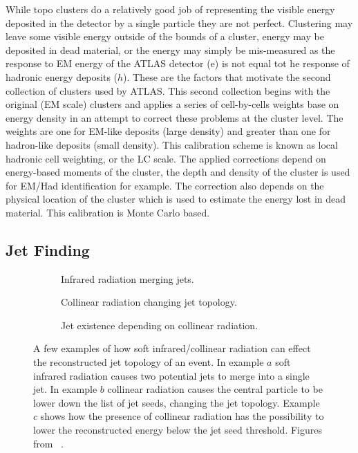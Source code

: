 While topo clusters do a relatively good job of representing the visible energy deposited in the detector by a single particle they are not perfect.  
Clustering may leave some visible energy outside of the bounds of a cluster, energy may be deposited in dead material, or the energy may simply be mis-measured as the response to EM energy of the ATLAS detector (e) is not equal tot he response of hadronic energy deposits ($h$).  
These are the factors that motivate the second collection of clusters used by ATLAS.  
This second collection begins with the original (EM scale) clusters and applies a series of cell-by-cells weights base on energy density in an attempt to correct these problems at the cluster level.  
The weights are one for EM-like deposits (large density) and greater than one for hadron-like deposits (small density).  
This calibration scheme is known as local hadronic cell weighting, or the LC scale.  
The applied corrections depend on energy-based moments of the cluster, the depth and density of the cluster is used for EM/Had identification for example.  
The correction also depends on the physical location of the cluster which is used to estimate the energy lost in dead material.  
This calibration is Monte Carlo based.  

\subsection{Jet Finding}

\begin{figure}[!ht]
 \centering
 \begin{subfigure}{.5\textwidth}
  \centering
  \caption{Infrared radiation merging jets.}
 \end{subfigure}%
 \begin{subfigure}{.5\textwidth}
  \centering
  \caption{Collinear radiation changing jet topology.}
 \end{subfigure}
 \begin{subfigure}{.5\textwidth}
  \centering
  \caption{Jet existence depending on collinear radiation.}
 \end{subfigure}
 \caption[Effect of radiation on jet building.]
  {A few examples of how soft infrared/collinear radiation can effect the reconstructed jet topology of an event.  In example $a$ soft infrared radiation causes two potential jets to merge into a single jet.  In example $b$ collinear radiation causes the central particle to be lower down the list of jet seeds, changing the jet topology.  Example $c$ shows how the presence of collinear radiation has the possibility to lower the reconstructed energy below the jet seed threshold.  Figures from ~\cite{Blazey:2000qt}. }
 \label{Fig:IRCoSafety}
\end{figure}

